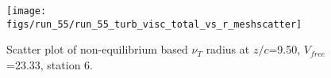 \begin{figure}[H]
\centering
\texttt{[image: figs/run\_55/run\_55\_turb\_visc\_total\_vs\_r\_meshscatter]}
\caption{Scatter plot of non-equilibrium based $\nu_T$ radius at $z/c$=9.50, $V_{free}$=23.33, station 6.}
\label{fig:run_55_turb_visc_total_vs_r_meshscatter}
\end{figure}


